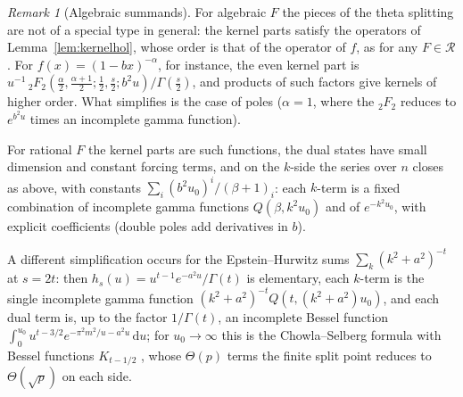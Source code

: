 \documentclass[11pt,reqno]{amsart}
\theoremstyle{definition}
\theoremstyle{remark}
\newtheorem{remark}[theorem]{Remark}
\newcommand{\dd}{\,\mathrm{d}}
\newcommand{\Reg}{\mathcal{R}}
\begin{document}
\begin{remark}[Algebraic summands]\label{rem:algebraic}
For algebraic $F$ the pieces of the theta splitting are not of a special type in general: the kernel parts satisfy the
operators of Lemma~\ref{lem:kernelhol}, whose order is that of the operator of $f$, as for any $F \in \Reg$. For
$f(x) = (1-bx)^{-\alpha}$, for instance, the even kernel part is $u^{-1}\,{}_2F_2(\frac\alpha2, \frac{\alpha+1}2;
\frac12, \frac s2; b^2u)/\Gamma(\frac s2)$, and products of such factors give kernels of higher order. What
simplifies is the case of poles ($\alpha = 1$, where the ${}_2F_2$ reduces to $e^{b^2u}$ times an incomplete gamma
function).

For rational $F$ the kernel parts are such functions, the dual states have small dimension and constant
forcing terms, and on the $k$-side the series over $n$ closes as above, with constants
$\sum_i(b^2u_0)^i/(\beta+1)_i$: each $k$-term is a fixed combination of incomplete gamma functions $Q(\beta, k^2u_0)$
and of $e^{-k^2u_0}$, with explicit coefficients (double poles add derivatives in $b$).

A different
simplification occurs for the Epstein--Hurwitz sums $\sum_k(k^2+a^2)^{-t}$ at $s = 2t$: then
$h_s(u) = u^{t-1}e^{-a^2u}/\Gamma(t)$ is elementary, each $k$-term is the single incomplete gamma function
$(k^2+a^2)^{-t}Q(t, (k^2+a^2)u_0)$, and each dual term is, up to the factor $1/\Gamma(t)$, an incomplete Bessel
function $\int_0^{u_0}u^{t-3/2}e^{-\pi^2m^2/u-a^2u}\dd u$; for $u_0 \to \infty$ this is the Chowla--Selberg formula with
Bessel functions $K_{t-1/2}$ \cite{Eli95,Kir02}, whose $\Theta(p)$ terms the finite split point reduces to
$\Theta(\sqrt p)$ on each side.
\end{remark}
\end{document}
